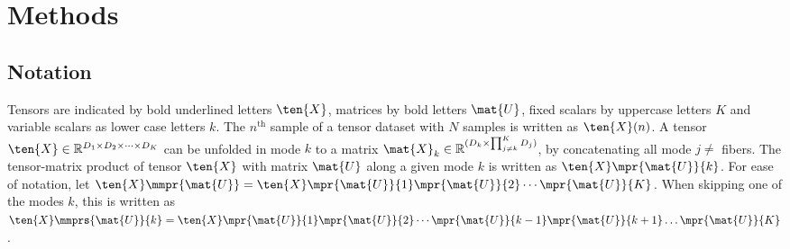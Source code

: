 \section{Methods}

\subsection{Notation}
Tensors are indicated by bold underlined letters $\ten{X}$, matrices by bold
letters $\mat{U}$, fixed scalars by uppercase letters $K$ and variable
scalars as lower case letters $k$.
The $n^\text{th}$ sample of a tensor dataset with $N$ samples is written as
$\ten{X}(n)$.
A tensor $\ten{X}\in \mathbb{R}^{D_1\times D_2 \times \cdots \times D_K}$ can be
unfolded in mode $k$ to a matrix
$\mat{X}_k\in\mathbb{R}^{(D_k\times\prod_{j\neq k}^K D_j)}$, by concatenating
all mode $j\neq$ fibers.
The tensor-matrix product of tensor $\ten{X}$ with matrix $\mat{U}$ along a
given mode $k$ is written as $\ten{X}\mpr{\mat{U}}{k}$. For ease of notation, let
$\ten{X}\mmpr{\mat{U}} =
	\ten{X}\mpr{\mat{U}}{1}\mpr{\mat{U}}{2}\cdots\mpr{\mat{U}}{K}$.
When skipping one of the modes $k$, this is
written as $\ten{X}\mmprs{\mat{U}}{k} =
	\ten{X}\mpr{\mat{U}}{1}\mpr{\mat{U}}{2}\cdots\mpr{\mat{U}}{k-1}\mpr{\mat{U}}{k+1}\ldots\mpr{\mat{U}}{K}$.


